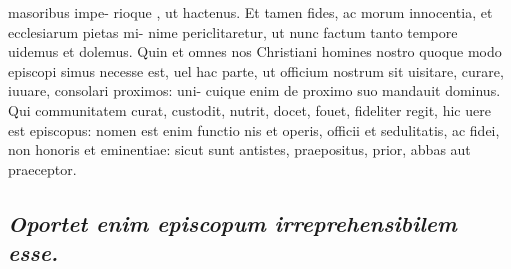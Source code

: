 \documentclass{article}
\begin{document}
\begin{pages}
masoribus impe- rioque , ut hactenus. Et tamen fides, ac morum innocentia, et ecclesiarum pietas mi- nime periclitaretur, ut nunc factum tanto tempore uidemus et dolemus. Quin et omnes nos Christiani homines nostro quoque modo episcopi simus necesse est, uel hac parte, ut officium nostrum sit uisitare, curare, iuuare, consolari proximos: uni- cuique enim de proximo suo mandauit dominus. Qui communitatem curat, custodit, nutrit, docet, fouet, fideliter regit, hic uere est episcopus: nomen est enim functio nis et operis, officii et sedulitatis, ac fidei, non honoris et eminentiae: sicut sunt antistes, praepositus, prior, abbas aut praeceptor.  \pend
{}
{}
\subsection*{\textit{Oportet enim episcopum irreprehensibilem esse. }}

\end{pages}
\end{document}
